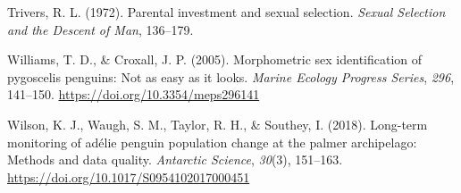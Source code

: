 \documentclass[
]{agujournal2019}
\newlength{\cslhangindent}
\newenvironment{CSLReferences}[2] %
 {\begin{list}{}{%
  \setlength{\itemindent}{0pt}
  \setlength{\leftmargin}{0pt}
  \setlength{\parsep}{0pt}
  \ifodd #1
   \setlength{\leftmargin}{\cslhangindent}
   \setlength{\itemindent}{-1\cslhangindent}
  \fi
  \setlength{\itemsep}{#2\baselineskip}}}
 {\end{list}}
\begin{document}
\begin{CSLReferences}{1}{0}
Trivers, R. L. (1972). Parental investment and sexual selection.
\emph{Sexual Selection and the Descent of Man}, 136--179.

Williams, T. D., \& Croxall, J. P. (2005). Morphometric sex
identification of pygoscelis penguins: Not as easy as it looks.
\emph{Marine Ecology Progress Series}, \emph{296}, 141--150.
\url{https://doi.org/10.3354/meps296141}

Wilson, K. J., Waugh, S. M., Taylor, R. H., \& Southey, I. (2018).
Long-term monitoring of adélie penguin population change at the palmer
archipelago: Methods and data quality. \emph{Antarctic Science},
\emph{30}(3), 151--163. \url{https://doi.org/10.1017/S0954102017000451}

\end{CSLReferences}
\end{document}
